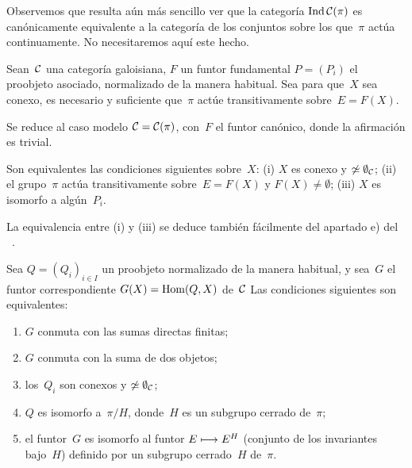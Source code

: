 Observemos que resulta aún más sencillo ver que la categoría
$\Ind\cal{C}(\pi)$ es canónicamente equivalente a la categoría de los
conjuntos sobre los que~$\pi$ actúa continuamente. No necesitaremos aquí
este hecho.

\begin{proposition}
\label{V.5.3}
Sean~$\cal{C}$ una categoría galoisiana, $F$ un funtor fundamental
$P=(P_i)$ el proobjeto asociado, normalizado de la manera habitual. Sea
para que~$X$ sea conexo, es necesario y suficiente que~$\pi$ actúe
transitivamente sobre~$E=F(X)$.
\end{proposition}

Se reduce al caso modelo $\cal{C}=\cal{C}(\pi)$, con~$F$ el funtor
canónico, donde la afirmación es trivial.

\begin{corollaire}
\label{V.5.4}
Son equivalentes las condiciones siguientes sobre~$X$: \textup{(i)} $X$ es
conexo y $\not\simeq\emptyset_{\cal{C}}$; \textup{(ii)} el grupo~$\pi$ actúa
transitivamente sobre~$E=F(X)$ y $F(X)\ne\emptyset$; \textup{(iii)} $X$ es
isomorfo a algún~$P_i$.
\end{corollaire}

La equivalencia
entre (i) y (iii) se deduce también fácilmente del apartado e) del
\No~.

\begin{proposition}
\label{V.5.5}
Sea $Q=(Q_i)_{i\in I}$ un proobjeto
normalizado de la manera habitual, y sea~$G$ el funtor correspondiente
$G(X)=\Hom(Q,X)$ de~$\cal{C}$
Las condiciones siguientes son equivalentes:
\begin{enumerate}
\item[(i)] $G$ conmuta con las sumas directas finitas;
\item[(ii)] $G$ conmuta con la suma de dos objetos;
\item[(iii)] los~$Q_i$ son conexos y
{$\not\simeq\emptyset_{\cal{C}}$};
\item[(iv)] $Q$ es isomorfo a~$\pi/H$, donde~$H$ es un subgrupo cerrado
de~$\pi$;
\item[(v)] el funtor~$G$ es isomorfo al funtor $E\mto E^H$ (conjunto de
los invariantes bajo~$H$) definido por un subgrupo cerrado~$H$ de~$\pi$.
\end{enumerate}
\end{proposition}

